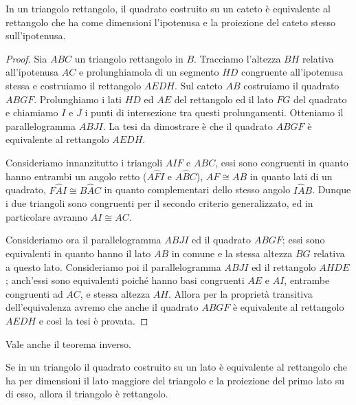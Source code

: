 \begin{teorema}
In un triangolo rettangolo, il quadrato costruito su un cateto è equivalente al rettangolo che ha come dimensioni l'ipotenusa e la proiezione del cateto stesso sull'ipotenusa.
\end{teorema}


\noindent\begin{minipage}{0.63\textwidth}\parindent15pt
\begin{proof}
Sia $ABC$ un triangolo rettangolo in $B$. Tracciamo l'altezza $BH$ relativa all'ipotenusa $AC$ e prolunghiamola di un segmento $HD$ congruente all'ipotenusa stessa e costruiamo il rettangolo $AEDH$. Sul cateto $AB$ costruiamo il quadrato $ABGF$. Prolunghiamo i lati $HD$ ed $AE$ del rettangolo ed il lato $FG$ del quadrato e chiamiamo $I$ e $J$ i punti di intersezione tra questi prolungamenti. Otteniamo il parallelogramma $ABJI$.
La tesi da dimostrare è che il quadrato $ABGF$ è equivalente al rettangolo $AEDH$.

Consideriamo innanzitutto i triangoli $AIF$ e $ABC$, essi sono congruenti in quanto hanno entrambi un angolo retto ($A\widehat{F}I$ e $A\widehat{B}C$), $AF\cong AB$ in quanto lati di un quadrato, $F\widehat{A}I\cong B\widehat{A}C$ in quanto complementari dello stesso angolo $I\widehat{A}B$.
Dunque i due triangoli sono congruenti per il secondo criterio generalizzato, ed in particolare avranno $AI\cong AC$.

Consideriamo ora il parallelogramma $ABJI$ ed il quadrato $ABGF$; essi sono equivalenti in quanto hanno il lato $AB$ in comune e la stessa altezza $BG$ relativa a questo lato. 
Consideriamo poi il parallelogramma $ABJI$ ed il rettangolo $AHDE$; anch'essi sono equivalenti poiché hanno basi congruenti $AE$ e $AI$, entrambe congruenti ad $AC$, e stessa altezza $AH$.
Allora per la proprietà transitiva dell'equivalenza avremo che anche il quadrato $ABGF$ è equivalente al rettangolo $AEDH$ e così la tesi è provata.
\end{proof}
\end{minipage}\hfil
\begin{minipage}{0.37\textwidth}
	\centering
\end{minipage}\vspace{8pt}

Vale anche il teorema inverso.
\begin{teorema}
Se in un triangolo il quadrato costruito su un lato è equivalente al rettangolo che ha per dimensioni il lato maggiore del triangolo e la proiezione del primo lato su di esso, allora il triangolo è rettangolo.
\end{teorema}


